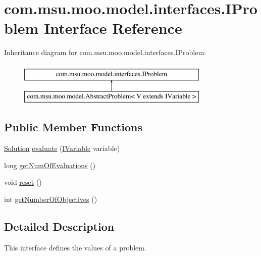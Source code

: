\hypertarget{interfacecom_1_1msu_1_1moo_1_1model_1_1interfaces_1_1IProblem}{\section{com.\-msu.\-moo.\-model.\-interfaces.\-I\-Problem Interface Reference}
\label{interfacecom_1_1msu_1_1moo_1_1model_1_1interfaces_1_1IProblem}
}
Inheritance diagram for com.\-msu.\-moo.\-model.\-interfaces.\-I\-Problem\-:\begin{figure}[H]
\begin{center}
\leavevmode
\includegraphics[height=2.000000cm]{interfacecom_1_1msu_1_1moo_1_1model_1_1interfaces_1_1IProblem}
\end{center}
\end{figure}
\subsection*{Public Member Functions}
\begin{DoxyCompactItemize}
\item 
\hyperlink{classcom_1_1msu_1_1moo_1_1model_1_1solution_1_1Solution}{Solution} \hyperlink{interfacecom_1_1msu_1_1moo_1_1model_1_1interfaces_1_1IProblem_a1ac7c52476b19b10a1e167551b9ead19}{evaluate} (\hyperlink{interfacecom_1_1msu_1_1moo_1_1model_1_1interfaces_1_1IVariable}{I\-Variable} variable)
\item 
long \hyperlink{interfacecom_1_1msu_1_1moo_1_1model_1_1interfaces_1_1IProblem_ad7dba60e3a3412017890543d3a0250b8}{get\-Num\-Of\-Evaluations} ()
\item 
void \hyperlink{interfacecom_1_1msu_1_1moo_1_1model_1_1interfaces_1_1IProblem_aca88ee486dcb7d96a218e76ea5034522}{reset} ()
\item 
int \hyperlink{interfacecom_1_1msu_1_1moo_1_1model_1_1interfaces_1_1IProblem_a3cac50c0c388545d9c70ac6893911c9f}{get\-Number\-Of\-Objectives} ()
\end{DoxyCompactItemize}


\subsection{Detailed Description}
This interface defines the values of a problem.

